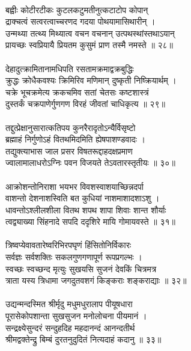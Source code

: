 \\
बह्वीः कोटीरटीकः कुटलकटुमतीनुत्कटाटोप कोपान्\\
     द्राक्चत्वं सत्वरत्वाच्चरणद गदया पोथयामासिथारीन् ।\\
उन्मथ्या तत्थ्य मिथ्यात्व वचन वचनान् उत्पथस्थांस्तथाऽयान्\\
     प्रायच्छः स्वप्रियायै प्रियतम कुसुमं प्राण तस्मै नमस्ते ॥ २८॥\\
\\
देहादुत्क्रामितानामधिपति रसतामक्रमाद्वक्रबुद्धिः\\
     क्रुद्धः क्रोधैकवश्यः क्रिमिरिव मणिमान् दुष्कृती निष्क्रियार्थम् ।\\
चक्रे भूचक्रमेत्य क्रकचमिव सतां चेतसः कष्टशास्त्रं\\
     दुस्तर्कं चक्रपाणेर्गुणगण विरहं जीवतां चाधिकृत्य ॥ २९॥\\
\\
तद्दुत्प्रेक्षानुसारात्कतिपय कुनरैरादृतोऽन्यैर्विसृष्टो\\
     ब्रह्माहं निर्गुणोऽहं वितथमिदमिति ह्येषपाशण्डवादः ।\\
तद्युक्त्याभास जाल प्रसर विषतरूद्दाहदक्षप्रमाण\\
     ज्वालामालाधरोऽग्निः पवन विजयते तेऽवतारस्तृतीयः ॥ ३०॥\\
\\
आक्रोशन्तोनिराशा भयभर विवशस्वाशयाच्छिन्नदर्पा\\
     वाशन्तो देशनाशस्विति बत कुधियां नाशमाशादशाऽशु ।\\
धावन्तोऽश्लीलशीला वितथ शपथ शापा शिवाः शान्त शौर्याः\\
     त्वद्व्याख्या सिंहनादे सपदि ददृशिरे मायि गोमायवस्ते ॥ ३१॥\\
\\
त्रिष्वप्येवावतारेष्वरिभिरपघृणं हिंसितोनिर्विकारः\\
     सर्वज्ञः सर्वशक्तिः सकलगुणगणापूर्ण रूपप्रगल्भः ।\\
स्वच्छः स्वच्छन्द मृत्युः सुखयसि सुजनं देवकिं चित्रमत्र\\
     त्राता यस्य त्रिधामा जगदुतवशगं किङ्कराः शङ्कराद्याः ॥ ३२॥\\
\\
उद्यन्मन्दस्मित श्रीर्मृदु मधुमधुरालाप पीयूषधारा\\
     पूरासेकोपशान्ता सुखसुजन मनोलोचना पीयमानं ।\\
सन्द्रक्ष्येसुन्दरं सन्दुहदिह महदानन्दं आनन्दतीर्थ\\
     श्रीमद्वक्तेन्द्रु बिम्बं दुरतनुदुदितं नित्यदाहं कदानु ॥ ३३॥\\
\\
